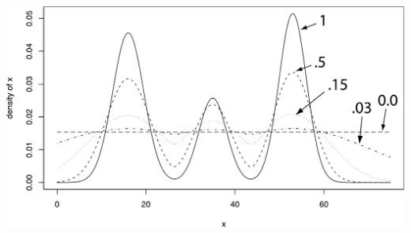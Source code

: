 \enlargethispage*{100pt}
\vspace*{-.09in}
\begin{center}
\includegraphics[width=.95\textwidth]{illus/3peak_squashed.pdf}
\end{center}

